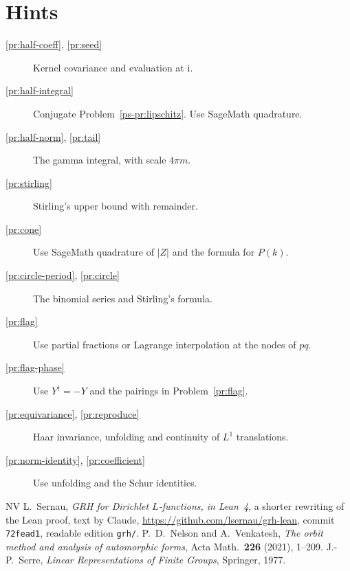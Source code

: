 \documentclass[reqno]{amsart}
\theoremstyle{definition}
\theoremstyle{plain}
\theoremstyle{remark}
\newcommand{\ii}{\mathrm i}
\begin{document}
\section*{Hints}

\begin{description}
\item[\ref{pr:half-coeff}, \ref{pr:seed}] Kernel covariance and evaluation at \(\ii\).
\item[\ref{pr:half-integral}] Conjugate Problem~\ref{ps-pr:lipschitz}.  Use SageMath quadrature.
\item[\ref{pr:half-norm}, \ref{pr:tail}] The gamma integral, with scale \(4\pi m\).
\item[\ref{pr:stirling}] Stirling's upper bound with remainder.
\item[\ref{pr:cone}] Use SageMath quadrature of \(|Z|\) and the formula for \(P(k)\).
\item[\ref{pr:circle-period}, \ref{pr:circle}] The binomial series and Stirling's formula.
\item[\ref{pr:flag}] Use partial fractions or Lagrange interpolation at the nodes of \(pq\).
\item[\ref{pr:flag-phase}] Use \(Y^\dagger=-Y\) and the pairings in Problem~\ref{pr:flag}.
\item[\ref{pr:equivariance}, \ref{pr:reproduce}] Haar invariance, unfolding and continuity of \(L^1\) translations.
\item[\ref{pr:norm-identity}, \ref{pr:coefficient}] Use unfolding and the Schur identities.
\end{description}

\begin{thebibliography}{NV}
 L.~Sernau, \emph{GRH for Dirichlet \(L\)-functions, in Lean~4}, a shorter rewriting of the Lean proof, text by Claude, \url{https://github.com/lsernau/grh-lean}, commit \texttt{72fead1}, readable edition \texttt{grh/}.
 P.~D.~Nelson and A.~Venkatesh, \emph{The orbit method and analysis of automorphic forms}, Acta Math.\ \textbf{226} (2021), 1--209.
 J.-P.~Serre, \emph{Linear Representations of Finite Groups}, Springer, 1977.
\end{thebibliography}
\end{document}
